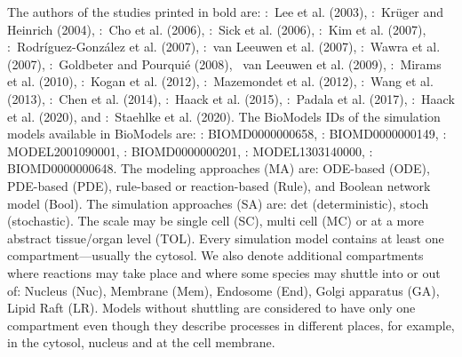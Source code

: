 \documentclass[10pt,letterpaper]{article}
\newcommand{\lee}{Lee et al. (2003)}
\begin{document}
\begin{table}[!ht]
\begin{adjustwidth}{-2.25in}{0in}
\begin{flushleft}
The authors of the studies printed in bold are: \cite{Lee2003}:~\lee{}, \cite{Kruger2004}:~Krüger and Heinrich (2004), \cite{Cho2006}:~Cho et al. (2006), \cite{Sick2006}:~Sick et al. (2006), \cite{Kim2007}:~Kim et al. (2007), \cite{Rodriguez2007}:~Rodríguez-González et al. (2007), \cite{vanLeeuwen2007}:~van Leeuwen et al. (2007), \cite{Wawra2007}:~Wawra et al. (2007), \cite{Goldbeter2008}:~Goldbeter and Pourquié (2008), \cite{vanLeeuwen2009}~van Leeuwen et al. (2009), \cite{Mirams2010}:~Mirams et al. (2010), \cite{Kogan2012}:~Kogan et al. (2012), \cite{Mazemondet2012}:~Mazemondet et al. (2012), \cite{Wang2013}:~Wang et al. (2013), \cite{Chen2014}:~Chen et al. (2014), \cite{Haack2015}:~Haack et al. (2015), \cite{Padala2017}:~Padala et al. (2017), \cite{Haack2020}:~Haack et al. (2020), and \cite{Staehlke2020}:~Staehlke et al. (2020).
The BioModels IDs of the simulation models available in BioModels are: \cite{Lee2003}: BIOMD0000000658, \cite{Kim2007}: BIOMD0000000149, \cite{vanLeeuwen2007}: MODEL2001090001, \cite{Goldbeter2008}: BIOMD0000000201, \cite{Mazemondet2012}: MODEL1303140000, \cite{Padala2017}: BIOMD0000000648.
The modeling approaches (MA) are: ODE-based (ODE), PDE-based (PDE), rule-based or reaction-based (Rule), and Boolean network model (Bool).
The simulation approaches (SA) are: det (deterministic), stoch (stochastic).
The scale may be single cell (SC), multi cell (MC) or at a more abstract tissue/organ level (TOL).
Every simulation model contains at least one compartment---usually the cytosol.
We also denote additional compartments where reactions may take place and where some species may shuttle into or out of: Nucleus (Nuc), Membrane (Mem), Endosome (End), Golgi apparatus (GA), Lipid Raft (LR).
Models without shuttling are considered to have only one compartment even though they describe processes in different places, for example, in the cytosol, nucleus and at the cell membrane.
\end{flushleft}
\label{tab:wntmodels}
\end{adjustwidth}
\end{table}
\end{document}
